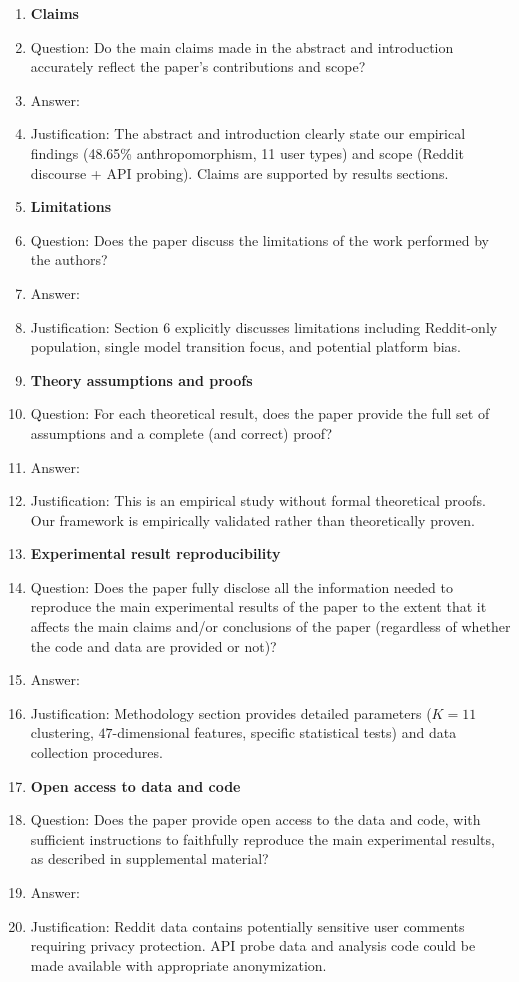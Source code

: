 \documentclass{article}
\begin{document}
\begin{enumerate}

\item {\bf Claims}
    \item[] Question: Do the main claims made in the abstract and introduction accurately reflect the paper's contributions and scope?
    \item[] Answer: \answerYes{} 
    \item[] Justification: The abstract and introduction clearly state our empirical findings (48.65\% anthropomorphism, 11 user types) and scope (Reddit discourse + API probing). Claims are supported by results sections.

\item {\bf Limitations}
    \item[] Question: Does the paper discuss the limitations of the work performed by the authors?
    \item[] Answer: \answerYes{} 
    \item[] Justification: Section 6 explicitly discusses limitations including Reddit-only population, single model transition focus, and potential platform bias.

\item {\bf Theory assumptions and proofs}
    \item[] Question: For each theoretical result, does the paper provide the full set of assumptions and a complete (and correct) proof?
    \item[] Answer: \answerNA{} 
    \item[] Justification: This is an empirical study without formal theoretical proofs. Our framework is empirically validated rather than theoretically proven.

\item {\bf Experimental result reproducibility}
    \item[] Question: Does the paper fully disclose all the information needed to reproduce the main experimental results of the paper to the extent that it affects the main claims and/or conclusions of the paper (regardless of whether the code and data are provided or not)?
    \item[] Answer: \answerYes{} 
    \item[] Justification: Methodology section provides detailed parameters ($K=11$ clustering, $47$-dimensional features, specific statistical tests) and data collection procedures.

\item {\bf Open access to data and code}
    \item[] Question: Does the paper provide open access to the data and code, with sufficient instructions to faithfully reproduce the main experimental results, as described in supplemental material?
    \item[] Answer: \answerNo{} 
    \item[] Justification: Reddit data contains potentially sensitive user comments requiring privacy protection. API probe data and analysis code could be made available with appropriate anonymization.


\end{enumerate}
\end{document}
